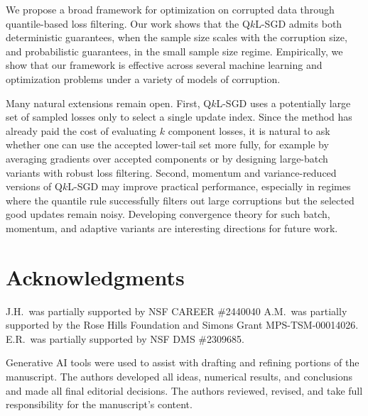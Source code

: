 \documentclass[11pt]{article}
\begin{document}
We propose a broad framework for optimization on corrupted data through quantile-based loss filtering. Our work shows that the  Q\(k\)L-SGD admits both deterministic guarantees, when the sample size scales with the corruption size, and probabilistic guarantees, in the small sample size regime. Empirically, we show that our framework is effective across several machine learning and optimization problems under a variety of models of corruption.

Many natural extensions remain open. First, Q\(k\)L-SGD uses a potentially
large set of sampled losses only to select a single update index. Since the
method has already paid the cost of evaluating \(k\) component losses, it is
natural to ask whether one can use the accepted lower-tail set more fully, for
example by averaging gradients over accepted components or by designing
large-batch variants with robust loss filtering. Second, momentum and
variance-reduced versions of Q\(k\)L-SGD may improve practical performance,
especially in regimes where the quantile rule successfully filters out large
corruptions but the selected good updates remain noisy. Developing convergence
theory for such batch, momentum, and adaptive variants are interesting
directions for future work.


\section*{Acknowledgments} J.H.\ was partially supported by NSF CAREER \#2440040 A.M.\ was partially supported by the Rose Hills Foundation and Simons Grant MPS-TSM-00014026. E.R.\ was partially supported by NSF DMS \#2309685.

Generative AI tools were used to assist with drafting and refining portions of the manuscript. The authors developed all ideas, numerical results, and conclusions and made all final editorial decisions. The authors reviewed, revised, and take full responsibility for the manuscript’s content.



\end{document}
